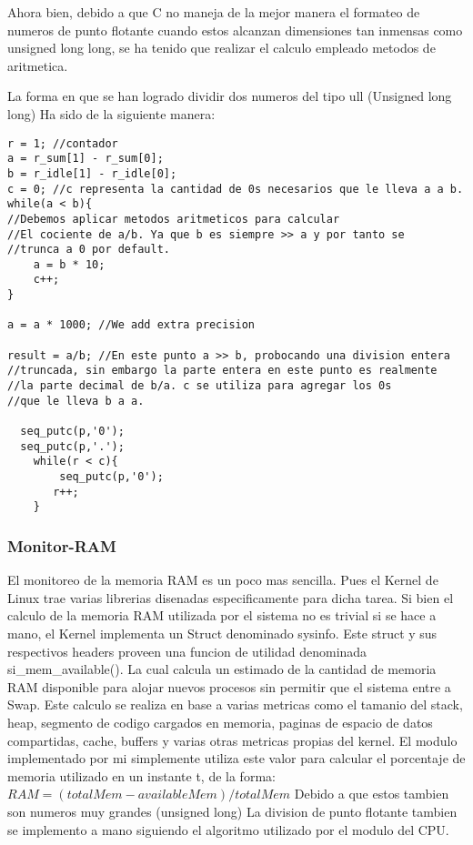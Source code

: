 \documentclass{article}
\begin{document}
Ahora bien, debido a que C no maneja de la mejor manera el formateo 
de numeros de punto flotante cuando estos alcanzan dimensiones 
tan inmensas como unsigned long long, se ha tenido que 
realizar el calculo empleado metodos de aritmetica.

La forma en que se han logrado dividir dos numeros del tipo ull (Unsigned 
long long) Ha sido de la siguiente manera:

\begin{lstlisting}
r = 1; //contador
a = r_sum[1] - r_sum[0];
b = r_idle[1] - r_idle[0];
c = 0; //c representa la cantidad de 0s necesarios que le lleva a a b.
while(a < b){
//Debemos aplicar metodos aritmeticos para calcular
//El cociente de a/b. Ya que b es siempre >> a y por tanto se 
//trunca a 0 por default.
    a = b * 10;
    c++;
}

a = a * 1000; //We add extra precision

result = a/b; //En este punto a >> b, probocando una division entera
//truncada, sin embargo la parte entera en este punto es realmente
//la parte decimal de b/a. c se utiliza para agregar los 0s 
//que le lleva b a a.

  seq_putc(p,'0');
  seq_putc(p,'.');
    while(r < c){
        seq_putc(p,'0');
       r++;
    }

\end{lstlisting} 

\subsubsection{Monitor-RAM}
El monitoreo de la memoria RAM es un poco mas sencilla. Pues 
el Kernel de Linux trae varias librerias disenadas especificamente
para dicha tarea. Si bien el calculo de la memoria RAM utilizada
por el sistema no es trivial si se hace a mano, el Kernel 
implementa un Struct denominado sysinfo. Este struct y sus 
respectivos headers proveen una funcion de utilidad denominada
si\_mem\_available(). La cual calcula un estimado de la cantidad de
memoria RAM disponible para alojar nuevos procesos sin permitir
que el sistema entre a Swap. Este calculo se realiza en base
a varias metricas como el tamanio del stack, heap, segmento de codigo
cargados en memoria, paginas de espacio de datos compartidas, cache,
buffers y varias otras metricas propias del kernel. 
El modulo implementado por mi simplemente utiliza este valor para
calcular el porcentaje de memoria utilizado en un instante t, de 
la forma:
$RAM = (totalMem - availableMem)/totalMem$
Debido a que estos tambien son numeros muy grandes (unsigned long)
La division de punto flotante tambien se implemento a mano 
siguiendo el algoritmo utilizado por el modulo del CPU.
\end{document}
